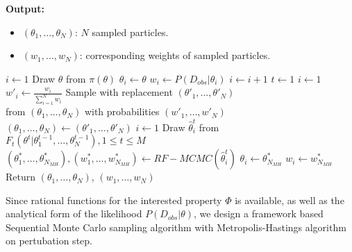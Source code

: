 \begin{algorithm}[H]
{\begin{itemize}
            \end{itemize}
            \hspace*{\algorithmicindent} \textbf{Output:}
            \begin{itemize}
                  \item $(\theta_1,\ldots,\theta_N)$: $N$ sampled particles.
                  \item $(w_1,\ldots,w_N)$: corresponding weights of sampled particles.
            \end{itemize}
      }
      \begin{algorithmic}[1]
            \State $i \leftarrow 1$
             
            \State Draw $\theta$ from $\pi(\theta)$
            \State $\theta_i \leftarrow \theta$
            \State $w_i \leftarrow P(D_{obs}|\theta_i)$
            \State $i \leftarrow i + 1$
            \EndWhile
            \State $t \leftarrow 1$
            \State $i \leftarrow 1$ 
            \State $w'_i \leftarrow \frac{w_i}{\sum_{i=1}^N w_i} $
            \EndWhile
            \State Sample with replacement $(\theta'_1,\ldots,\theta'_N)$  \\\hspace{1.5cm} from $(\theta_1,\ldots,\theta_N)$ with probabilities $(w'_1,\ldots,w'_N)$
            \State $(\theta_1,\ldots,\theta_N) \leftarrow (\theta'_1,\ldots,\theta'_N)$
            \State $i \leftarrow 1$
             
            \State Draw $\hat{\theta}^t_i$ from $F_t(\theta^t | \theta^{t-1}_1,\ldots,\theta^{t-1}_N), 1\leq t \leq M$
            \State $(\theta^*_1,\ldots,\theta^*_{N_{MH}}), (w^*_1,\ldots,w^*_{N_{MH}}) \leftarrow RF-MCMC(\hat{\theta}^t_i)$
            \State $\theta_i \leftarrow \theta^*_{N_{MH}}$
            \State $w_i \leftarrow w^*_{N_{MH}}$
            \EndWhile
            \EndWhile
            \State Return $(\theta_1,\ldots,\theta_{N})$, $(w_1,\ldots,w_{N})$
            \EndProcedure
      \end{algorithmic}
\end{algorithm}
Since rational functions for the interested property $\Phi$ is available, as well as the analytical
form of the likelihood $P(D_{obs}|\theta)$, we design a framework based Sequential Monte Carlo
sampling algorithm with Metropolis-Hastings algorithm on pertubation step.

